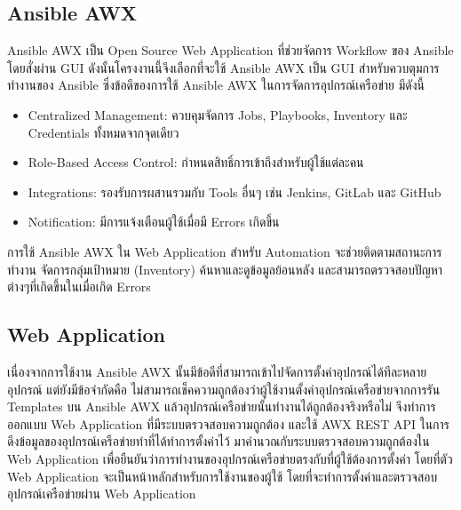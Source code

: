 \subsection{Ansible AWX}
\hspace{0.5in} Ansible AWX เป็น Open Source Web Application ที่ช่วยจัดการ Workflow ของ Ansible โดยสั่งผ่าน GUI ดังนั้นโครงงานนี้จึงเลือกที่จะใช้ Ansible AWX เป็น GUI สำหรับควบตุมการทำงานของ Ansible ซึ่งข้อดีของการใช้ Ansible AWX ในการจัดการอุปกรณ์เครือข่าย มีดังนี้
\begin{itemize}
  \item Centralized Management: ควบคุมจัดการ Jobs, Playbooks, Inventory และ Credentials ทั้งหมดจากจุดเดียว
  \item Role-Based Access Control: กำหนดสิทธิ์การเข้าถึงสำหรับผู้ใช้แต่ละคน
  \item Integrations: รองรับการผสานรวมกับ Tools อื่นๆ เช่น Jenkins, GitLab และ GitHub
  \item Notification: มีการแจ้งเตือนผู้ใช้เมื่อมี Errors เกิดขึ้น
\end{itemize}
\hspace{0.5in} การใช้ Ansible AWX ใน Web Application สำหรับ Automation จะช่วยติดตามสถานะการทำงาน จัดการกลุ่มเป้าหมาย (Inventory) ค้นหาและดูข้อมูลย้อนหลัง และสามารถตรวจสอบปัญหาต่างๆที่เกิดขึ้นในเมื่อเกิด Errors

\subsection{Web Application}
\hspace{0.5in} เนื่องจากการใช้งาน Ansible AWX นั้นมีข้อดีที่สามารถเข้าไปจัดการตั้งค่าอุปกรณ์ได้ทีละหลายอุปกรณ์ แต่ยังมีข้อจำกัดคือ ไม่สามารถเช็คความถูกต้องว่าผู้ใช้งานตั้งค่าอุปกรณ์เครือข่ายจากการรัน Templates บน Ansible AWX แล้วอุปกรณ์เครือข่ายนั้นทำงานได้ถูกต้องจริงหรือไม่ จึงทำการออกแบบ Web Application ที่มีระบบตรวจสอบความถูกต้อง และใช้ AWX REST API ในการดึงข้อมูลของอุปกรณ์เครือข่ายทำที่ได้ทำการตั้งค่าไว้ มาคำนวณกับระบบตรวจสอบความถูกต้องใน Web Application เพื่อยืนยันว่าการทำงานของอุปกรณ์เครือข่ายตรงกับที่ผู้ใช้ต้องการตั้งค่า โดยที่ตัว Web Application จะเป็นหน้าหลักสำหรับการใช้งานของผู้ใช้ โดยที่จะทำการตั้งค่าและตรวจสอบอุปกรณ์เครือข่ายผ่าน Web Application
